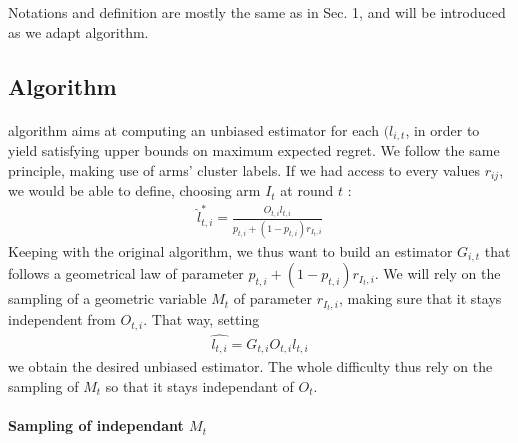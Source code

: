 \documentclass[11pt,a4paper]{article}
\begin{document}
Notations and definition are mostly the same as in Sec. 1, and will be introduced as we adapt \cite{valko} algorithm. 

\subsection{Algorithm}

\paragraph{}\cite{valko} algorithm aims at computing an unbiased estimator for each $(l_{i,t}$, in order to yield satisfying upper bounds on maximum expected regret. We follow the same principle, making use of arms' cluster labels. If we had access to every values $r_{ij}$, we would be able to define, choosing arm $I_t$ at round $t$ : 
\begin{align*}
\hat l_{t,i}^{*} = \frac{O_{t,i}l_{t,i}}{p_{t,i}+(1-p_{t,i})r_{I_t,i}}
\end{align*}
Keeping with the original algorithm, we thus want to build an estimator $G_{i,t}$ that follows a geometrical law of parameter $p_{t,i}+(1-p_{t,i})r_{I_t,i}$. We will rely on the sampling of a geometric variable $M_t$ of parameter $r_{I_t,i}$, making sure that it stays independent from $O_{t,i}$. That way, setting
\begin{align*}
\hat{l_{t,i}}=G_{t,i}O_{t,i}l_{t,i}
\end{align*}
we obtain the desired unbiased estimator. The whole difficulty thus rely on the sampling of $M_t$ so that it stays independant of $O_t$.

\paragraph{Sampling of independant $M_t$}
\end{document}
